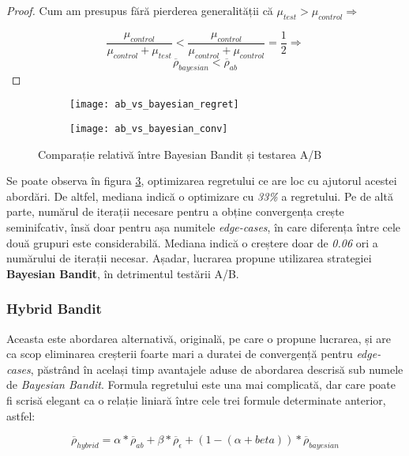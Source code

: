 \begin{proof}
Cum am presupus fără pierderea generalității că $\mu_{test} > \mu_{control} \Rightarrow$

\[
\frac{\mu_{control}}{\mu_{control} + \mu_{test}} < \frac{\mu_{control}}{\mu_{control} + \mu_{control}} = \frac{1}{2} \Rightarrow
\]
\[
\overline{\rho}_{bayesian} < \overline{\rho}_{ab}
\]
\end{proof}


\begin{figure}[H]
	\centering
	\begin{subfigure}{.5\textwidth}
		\centering
		\texttt{[image: ab\_vs\_bayesian\_regret]}
		\label{fig:sub1}
	\end{subfigure}%
	\begin{subfigure}{.5\textwidth}
		\centering
		\texttt{[image: ab\_vs\_bayesian\_conv]}
		\label{fig:sub2}
	\end{subfigure}
	\caption{Comparație relativă între Bayesian Bandit și testarea A/B}
	\label{fig:ab_vs_bayesian}
\end{figure}

Se poate observa în figura \ref{fig:ab_vs_bayesian}, optimizarea regretului ce are loc cu ajutorul acestei abordări. De altfel, mediana indică o optimizare cu \textit{33\%} a regretului. Pe de altă parte, numărul de iterații necesare pentru a obține convergența crește seminifcativ, însă doar pentru așa numitele \textit{edge-cases}, în care diferența între cele două grupuri este considerabilă. Mediana indică o creștere doar de \textit{0.06} ori a numărului de iterații necesar. Așadar, lucrarea propune utilizarea strategiei \textbf{Bayesian Bandit}, în detrimentul testării A/B.

\subsubsection{Hybrid Bandit}

Aceasta este abordarea alternativă, originală, pe care o propune lucrarea, și are ca scop eliminarea creșterii foarte mari a duratei de convergență pentru \textit{edge-cases}, păstrând în același timp avantajele aduse de abordarea descrisă sub numele de \textit{Bayesian Bandit}. Formula regretului este una mai complicată, dar care poate fi scrisă elegant ca o relație liniară între cele trei formule determinate anterior, astfel:

\[
\overline{\rho}_{hybrid} = \alpha * \overline{\rho}_{ab}  + \beta * \overline{\rho}_{\epsilon} + (1 - (\alpha + beta)) * \overline{\rho}_{bayesian} 
\]

